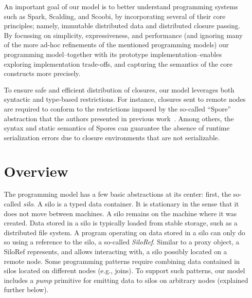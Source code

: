 \documentclass{easychair}
\begin{document}
An important goal of our model is to better understand programming systems such as Spark, Scalding, and
Scoobi, by incorporating several of their core principles; namely, immutable
distributed data and distributed closure passing. By focussing on simplicity,
expressiveness, and performance (and ignoring many of the more ad-hoc
refinements of the mentioned programming models) our
programming model--together with its prototype implementation--enables exploring
implementation trade-offs, and capturing the semantics of the core constructs more
precisely.


To ensure safe and efficient distribution of closures, our model leverages
both syntactic and type-based restrictions. For instance, closures sent to
remote nodes are required to conform to the restrictions imposed by the
so-called ``Spore'' abstraction that the authors presented in previous
work~\cite{MillerHO14}. Among others, the syntax and static semantics of
Spores can guarantee the absence of runtime serialization errors due to
closure environments that are not serializable.


\section{Overview}
\label{sec:overview}


The programming model has a few basic abstractions at its center: first, the
so-called \emph{silo}. A silo is a typed data container. It is stationary in the
sense that it does not move between machines. A silo remains on the machine
where it was created. Data stored in a silo is typically loaded from stable
storage, such as a distributed file system. A program operating on data stored
in a silo can only do so using a reference to the silo, a so-called \emph{SiloRef}.
Similar to a proxy object, a SiloRef represents, and allows interacting with,
a silo possibly located on a remote node. Some programming patterns require
combining data contained in silos located on different nodes (e.g., joins). To
support such patterns, our model includes a \emph{pump} primitive for emitting
data to silos on arbitrary nodes (explained further below).
\end{document}
